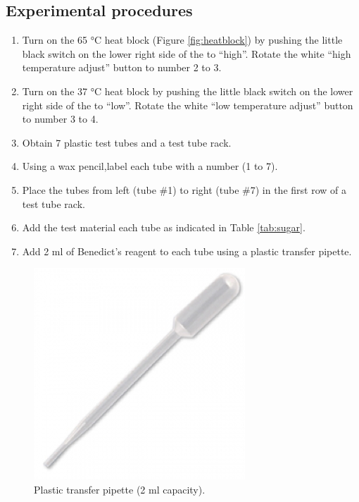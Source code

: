 \subsection{Experimental procedures}\label{experimental-procedures-1}

\begin{enumerate}
\def\labelenumi{\arabic{enumi}.}
\tightlist
\item
  Turn on the 65 °C heat block (Figure \ref{fig:heatblock}) by pushing
  the little black switch on the lower right side of the to ``high''.
  Rotate the white ``high temperature adjust'' button to number 2 to 3.
\item
  Turn on the 37 °C heat block by pushing the little black switch on the
  lower right side of the to ``low''. Rotate the white ``low temperature
  adjust'' button to number 3 to 4.
\item
  Obtain 7 plastic test tubes and a test tube rack.
\item
  Using a wax pencil,label each tube with a number (1 to 7).
\item
  Place the tubes from left (tube \#1) to right (tube \#7) in the first
  row of a test tube rack.
\item
  Add the test material each tube as indicated in Table \ref{tab:sugar}.
\item
  Add 2 ml of Benedict's reagent to each tube using a plastic transfer
  pipette.
\end{enumerate}

\begin{figure}

{\centering \includegraphics[width=0.7\linewidth]{./figures/chem_aspects/Transfer_pipette} 

}

\caption{Plastic transfer pipette (2 ml capacity).}\label{fig:pipette}
\end{figure}

